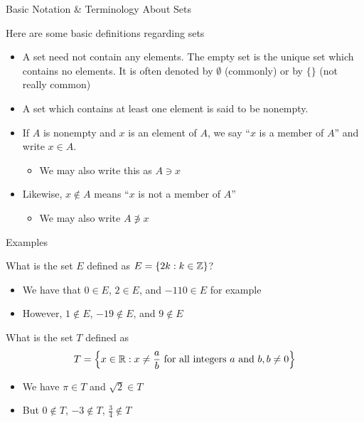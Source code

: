 \documentclass{beamer}
\begin{document}
		\begin{frame}{Basic Notation \& Terminology About Sets}
				\begin{definition}[]
						Here are some basic definitions regarding sets 
						\begin{itemize}
								\item A set need not contain any elements. The \alert{empty set} is the unique set which contains no elements. It is often denoted by $\emptyset$ (commonly) or by $\{\}$ (not really common)
								\item A set which contains at least one element is said to be \alert{nonempty}. 
								\item If $A$ is nonempty and $x$ is an element of $A$, we say ``$x$ is a member of $A$'' and write $x\in A$. 
										\begin{itemize}
												\item We may also write this as $A \ni x$
										\end{itemize}
								\item Likewise, $x\not\in A$ means ``$x$ is not a member of $A$'' 
										\begin{itemize}
												\item We may also write $A \not \ni x$
										\end{itemize}
						\end{itemize}
				\end{definition}
		\end{frame}

		\begin{frame}{Examples}
				\begin{example}[]
						What is the set $E$ defined as $E = \{2k : k\in \mathbb{Z}\}$? 
				\end{example}
				\begin{itemize}
						\item We have that $0\in E$, $2\in E$, and $-110\in E$ for example 
						\item However, $1\not\in E$, $-19\not\in E$, and $9\not\in E$
				\end{itemize}

				\begin{example}[]
						What is the set $T$ defined as 
						\begin{equation*}
								T = \left\{x\in\mathbb{R} : x \neq \frac{a}{b} \text{ for all integers $a$ and $b$}, b \neq 0\right\}
						\end{equation*}
				\end{example}
				\begin{itemize}
						\item We have $\pi \in T$ and $\sqrt{2}\in T$ 
						\item But $0\not\in T$, $-3\not\in T$, $\frac{3}{4}\not\in T$
				\end{itemize}
		\end{frame}
\end{document}
